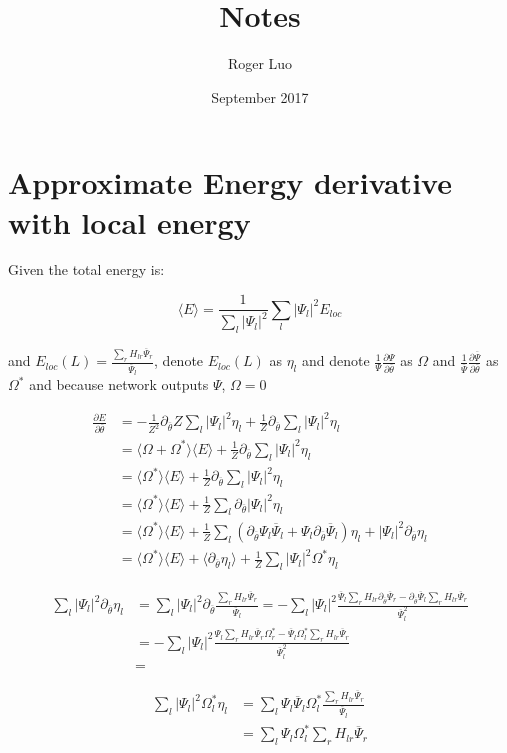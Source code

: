 \documentclass{article}
\title{Notes}
\author{Roger Luo}
\date{September 2017}
\newcommand{\mean}[1]{\langle #1 \rangle}
\newcommand{\conj}[1]{\overline{#1}}
\newcommand{\diff}[1]{\partial_{\conj{\theta}} #1}
\begin{document}
\maketitle

\section{Approximate Energy derivative with local energy}

Given the total energy is:

\begin{equation}
    \mean{E} = \frac{1}{\sum_l |\Psi_l|^2}\sum_l |\Psi_l|^2 E_{loc}
\end{equation}

and $E_{loc}(L) = \frac{\sum_{r}H_{lr}\conj{\Psi}_r}{\conj{\Psi}_l}$, denote $E_{loc}(L)$ as $\eta_l$ and denote $\frac{1}{\Psi}\frac{\partial \Psi}{\partial \conj{\theta}}$ as $\Omega$ and $\frac{1}{\conj{\Psi}}\frac{\partial \conj{\Psi}}{\partial \conj{\theta}}$ as $\Omega^*$ and because network outputs $\Psi$, $\Omega=0$

\begin{equation}
\begin{aligned}
    \frac{\partial E}{\partial \conj{\theta}} &= -\frac{1}{Z^2} \diff{Z} \sum_l |\Psi_l|^2 \eta_l + \frac{1}{Z}\diff{\sum_l |\Psi_l|^2 \eta_l} \\
    &= \mean{\Omega + \Omega^*} \mean{E} + \frac{1}{Z}\diff{\sum_l |\Psi_l|^2 \eta_l}\\
    &= \mean{\Omega^*}\mean{E} + \frac{1}{Z}\diff{\sum_l |\Psi_l|^2 \eta_l}\\
    &= \mean{\Omega^*}\mean{E} + \frac{1}{Z}\sum_l \diff{|\Psi_l|^2} \eta_l\\
    &= \mean{\Omega^*}\mean{E} + \frac{1}{Z}\sum_l (\diff{\Psi_l}\conj{\Psi}_l + \Psi_l\diff{\conj{\Psi}_l})\eta_l + |\Psi_l|^2 \diff{\eta_l}\\
    &= \mean{\Omega^*}\mean{E} + \mean{\diff{\eta_l}} + \frac{1}{Z}\sum_l |\Psi_l|^2 \Omega^*\eta_l
\end{aligned}
\end{equation}

\begin{equation}
\begin{aligned}
\sum_l |\Psi_l|^2 \diff{\eta_l} &= \sum_l |\Psi_l|^2 \diff{\frac{\sum_{r}H_{lr}\conj{\Psi}_r}{\conj{\Psi}_l}} = - \sum_l |\Psi_l|^2 \frac{\conj{\Psi}_l\sum_r H_{lr}\diff{\conj{\Psi}_r} - \diff{\conj{\Psi}_l}\sum_r H_{lr}\conj{\Psi}_r}{\conj{\Psi}_l^2} \\
&= -\sum_l |\Psi_l|^2 \frac{\Psi_l\sum_r H_{lr}\conj{\Psi}_r\Omega_r^* - \conj{\Psi}_l\Omega_l^*\sum_r H_{lr}\conj{\Psi}_r}{\conj{\Psi}_l^2}\\
&= 
\end{aligned}
\end{equation}

\begin{equation}
\begin{aligned}
\sum_l |\Psi_l|^2 \Omega_l^* \eta_l &= \sum_l\Psi_l\conj{\Psi}_l \Omega_l^* \frac{\sum_r H_{lr}\conj{\Psi}_r}{\conj{\Psi}_l}\\
&= \sum_l \Psi_l\Omega_l^*\sum_r H_{lr}\conj{\Psi}_r
\end{aligned}
\end{equation}
\end{document}
